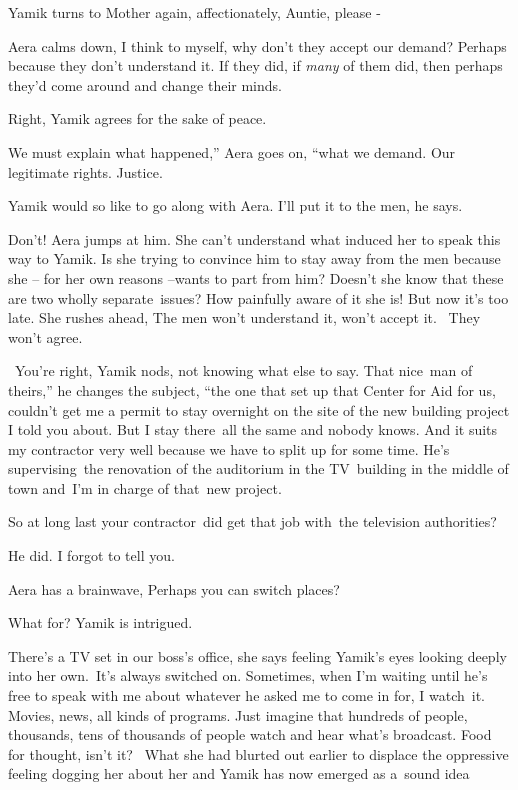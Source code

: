 \documentclass[twoside,11pt]{book}
\begin{document}
Yamik turns to Mother again, affectionately, {\textquotedbl}Auntie, please -{\textquotedbl}\ 

Aera calms down, {\textquotedbl}I think to myself, why don't they accept our demand? Perhaps because they don't
understand it. If they did, if \textit{many} of them did, then perhaps they'd come around and change their
minds.{\textquotedbl} 

{\textquotedbl}Right,{\textquotedbl} Yamik agrees for the sake of peace.

{\textquotedbl}We must explain what happened,'' Aera goes on, ``what we demand. Our legitimate rights.
Justice.{\textquotedbl} 

Yamik would so like to go along with Aera. {\textquotedbl}I'll put it to the men,{\textquotedbl} he says.

{\textquotedbl}Don't!{\textquotedbl} Aera jumps at him. She can't understand what induced her to speak this way to
Yamik. Is she trying to convince him to stay away from the men because she -- for her own reasons --wants to part from
him? Doesn't she know that these are two wholly separate\ issues? How painfully aware of it she is! But now it's too
late. She rushes ahead, {\textquotedbl}The men won't understand it, won't accept it.~ They won't agree.{\textquotedbl} 

~{\textquotedbl}You're right,{\textquotedbl} Yamik nods, not knowing what else to say. {\textquotedbl}That nice\ man of
theirs,'' he changes the subject, ``the one that set up that Center for Aid for us, couldn't get me a permit to stay
overnight on the site of the new building project I told you about. But I stay there~all the same and nobody knows. And
it suits my contractor very well because we have to split up for some time. He's supervising~the renovation of the
auditorium in the TV~building in the middle of town and~I'm in charge of that~new project.{\textquotedbl} 

{\textquotedbl}So at long last your contractor~did get that job with~the television authorities?{\textquotedbl} 

{\textquotedbl}He did. I forgot to tell you.{\textquotedbl} 

Aera has a brainwave, {\textquotedbl}Perhaps you can switch places?{\textquotedbl} 

{\textquotedbl}What for?{\textquotedbl} Yamik is intrigued.

{\textquotedbl}There's a TV set in our boss's office,{\textquotedbl} she says feeling Yamik's eyes looking deeply into
her own.\  {\textquotedbl}It's always switched on. Sometimes, when I'm waiting until he's free to speak with me about
whatever he asked me to come in for, I watch~it. Movies, news, all kinds of programs. Just imagine that hundreds of
people, thousands, tens of thousands of people watch and hear what's broadcast. Food for thought, isn't
it?{\textquotedbl}~ What she had blurted out earlier to displace the oppressive feeling dogging her about her and Yamik
has now emerged as a\ sound idea
\end{document}
